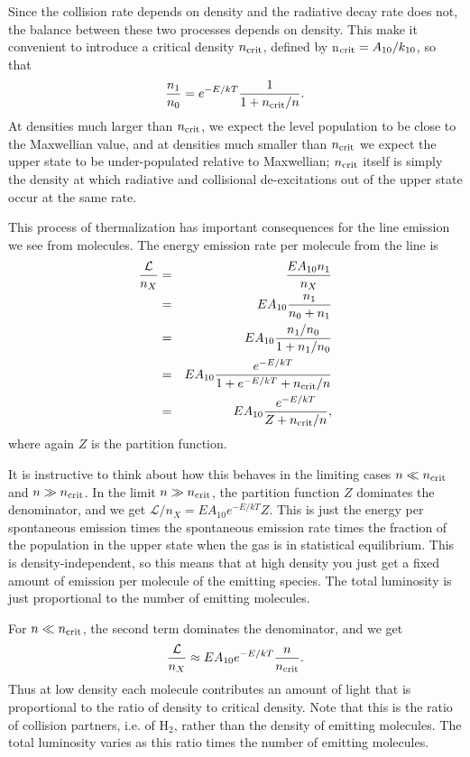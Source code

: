 Since the collision rate depends on density and the radiative decay rate does not, the balance between these two processes depends on density. This make it convenient to introduce a critical density $n_{\rm crit}$, defined by n$_{\rm crit} = A_{10} / k_{10}$, so that
\begin{equation}
\frac{n_1}{n_0} = e^{-E/kT} \frac{1}{1+n_{\rm crit}/n}.
\end{equation}
At densities much larger than $n_{\rm crit}$, we expect the level population to be close to the Maxwellian value, and at densities much smaller than $n_{\rm crit}$ we expect the upper state to be under-populated relative to Maxwellian; $n_{\rm crit}$ itself is simply the density at which radiative and collisional de-excitations out of the upper state occur at the same rate.

This process of thermalization has important consequences for the line emission we see from molecules. The energy emission rate per molecule from the line is 
\begin{eqnarray}
\frac{\mathcal{L}}{n_X} & = & \frac{E A_{10} n_1}{n_X} \\
& = & E A_{10} \frac{n_1}{n_0+n_1} \\
& = & E A_{10} \frac{n_1/n_0}{1+n_1/n_0} \\
& = & E A_{10} \frac{e^{-E/kT}}{1+e^{-E/kT}+n_{\rm crit}/n} \\
& = & E A_{10} \frac{e^{-E/kT}}{Z+n_{\rm crit}/n},
\end{eqnarray}
where again $Z$ is the partition function.

It is instructive to think about how this behaves in the limiting cases $n \ll n_{\rm crit}$ and $n\gg n_{\rm crit}$. In the limit $n\gg n_{\rm crit}$, the partition function $Z$ dominates the denominator, and we get $\mathcal{L}/n_X = E A_{10} e^{-E/kT}{Z}$. This is just the energy per spontaneous emission times the spontaneous emission rate times the fraction of the population in the upper state when the gas is in statistical equilibrium. This is density-independent, so this means that at high density you just get a fixed amount of emission per molecule of the emitting species. The total luminosity is just proportional to the number of emitting molecules.

For $n \ll n_{\rm crit}$, the second term dominates the denominator, and we get
\begin{equation}
\label{eq:cool_lowden}
\frac{\mathcal{L}}{n_X} \approx E A_{10} e^{-E/kT} \frac{n}{n_{\rm crit}}.
\end{equation}
Thus at low density each molecule contributes an amount of light that is proportional to the ratio of density to critical density. Note that this is the ratio of collision partners, i.e. of H$_2$, rather than the density of emitting molecules. The total luminosity varies as this ratio times the number of emitting molecules.

